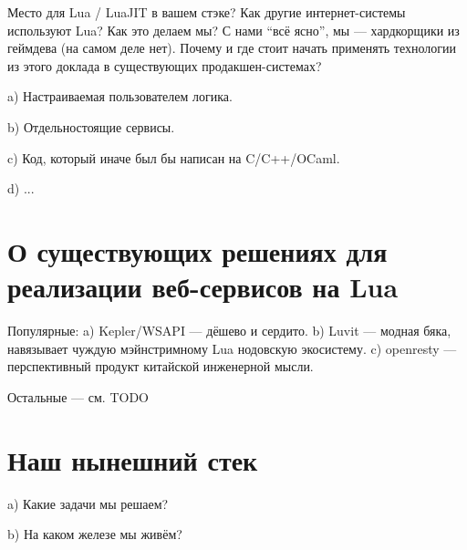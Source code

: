 \documentclass[handout]{beamer}
\begin{document}
\begin{frame}
Место для Lua / LuaJIT в вашем стэке? Как другие интернет-системы используют Lua? Как это делаем мы? С нами “всё ясно”, мы — хардкорщики из геймдева (на самом деле нет). Почему и где стоит начать применять технологии из этого доклада в существующих продакшен-системах?
\end{frame}

\begin{frame}
a) Настраиваемая пользователем логика.
\end{frame}

\begin{frame}
b) Отдельностоящие сервисы.
\end{frame}

\begin{frame}
c) Код, который иначе был бы написан на C/C++/OCaml.
\end{frame}

\begin{frame}
d) ...
\end{frame}


\section{О существующих решениях для реализации веб-сервисов на Lua}

\begin{frame}
Популярные:
a) Kepler/WSAPI — дёшево и сердито.
b) Luvit — модная бяка, навязывает чуждую мэйнстримному Lua нодовскую экосистему.
c) openresty — перспективный продукт китайской инженерной мысли.

Остальные — см. TODO
\end{frame}


\section{Наш нынешний стек}

\begin{frame}
a) Какие задачи мы решаем?
\end{frame}

\begin{frame}
b) На каком железе мы живём?
\end{frame}
\end{document}
